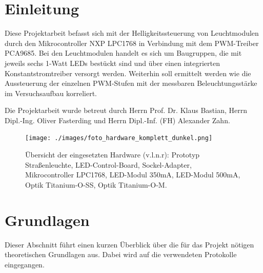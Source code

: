 \documentclass[a4paper,12pt]{scrartcl}
\begin{document}
\addtolength{\voffset}{0cm}


\tableofcontents

\clearpage

\onehalfspacing


\clearpage
\listoffigures

\clearpage
\section{Einleitung}
Diese Projektarbeit befasst sich mit der Helligkeitssteuerung von Leuchtmodulen durch den Mikrocontroller NXP LPC1768 in Verbindung mit dem PWM-Treiber PCA9685. Bei den Leuchtmodulen handelt es sich um Baugruppen, die mit jeweils sechs 1-Watt LEDs bestückt sind und über einen integrierten Konstantstromtreiber versorgt werden. Weiterhin soll ermittelt werden wie die Aussteuerung der einzelnen PWM-Stufen mit der messbaren Beleuchtungsstärke im Versuchsaufbau korreliert. 

Die Projektarbeit wurde betreut durch Herrn Prof. Dr. Klaus Bastian, Herrn Dipl.-Ing. Oliver Fasterding und Herrn Dipl.-Inf. (FH) Alexander Zahn.
\begin{figure}[htb]
  \begin{center}
    \texttt{[image: ./images/foto\_hardware\_komplett\_dunkel.png]}
  \end{center}
\caption[Übersicht der eingesetzten Hardware]{\label{fotohwuebersicht}\"Ubersicht der eingesetzten Hardware (v.l.n.r): Prototyp Straßenleuchte, LED-Control-Board, Sockel-Adapter, Mikrocontroller LPC1768, LED-Modul 350mA, LED-Modul 500mA, Optik Titanium-O-SS, Optik Titanium-O-M.}
\end{figure}

\clearpage
\section{Grundlagen}

Dieser Abschnitt führt einen kurzen Überblick über die für das Projekt nötigen theoretischen Grundlagen aus. Dabei wird auf die verwendeten Protokolle eingegangen.
\end{document}

